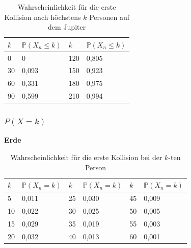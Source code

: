 \documentclass[../main.tex]{subfiles}
\begin{document}
    \begin{table}[h]
        \centering
        \begin{tabular}{|l|l|l|l|}
            \hline
            $k$ & $\mathbb{P}(X_{n} \leq k)$ & $k$ & $\mathbb{P}(X_{n} \leq k)$ \\ \hline
            0   & 0                          & 120 & 0,805                      \\
            30  & 0,093                      & 150 & 0,923                      \\
            60  & 0,331                      & 180 & 0,975                      \\
            90  & 0,599                      & 210 & 0,994                      \\ \hline
        \end{tabular}
        \caption{\label{num.tpj} Wahrscheinlichkeit für die erste Kollision nach höchstens $k$ Personen auf dem Jupiter}
    \end{table}

    \subsubsection{$P(X = k)$}

    \textbf{Erde}

    \begin{table}[h]
        \centering
        \begin{tabular}{|l|l|l|l|l|l|}
            \hline
            $k$ & $\mathbb{P}(X_{n} = k)$ & $k$ & $\mathbb{P}(X_{n} = k)$ & $k$ & $\mathbb{P}(X_{n} = k)$ \\ \hline
            5   & 0,011                   & 25  & 0,030                   & 45  & 0,009                   \\
            10  & 0,022                   & 30  & 0,025                   & 50  & 0,005                   \\
            15  & 0,029                   & 35  & 0,019                   & 55  & 0,003                   \\
            20  & 0,032                   & 40  & 0,013                   & 60  & 0,001                   \\ \hline
        \end{tabular}
        \caption{\label{num.tpeqe} Wahrscheinlichkeit für die erste Kollision bei der $k$-ten Person}
    \end{table}
\end{document}
